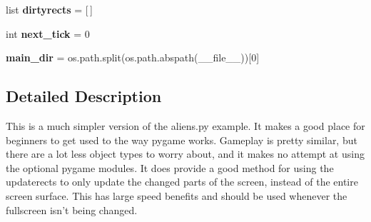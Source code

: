 \begin{DoxyCompactItemize}
list {\bfseries dirtyrects} = \mbox{[}$\,$\mbox{]}
\item 
\mbox{\label{namespacepygame_1_1examples_1_1oldalien_a0a712e753acbf5c4e3de1cf4933838c5}} 
int {\bfseries next\+\_\+tick} = 0
\item 
\mbox{\label{namespacepygame_1_1examples_1_1oldalien_a6ddc64ba8b4814f37fb935b0de86d53a}} 
{\bfseries main\+\_\+dir} = os.\+path.\+split(os.\+path.\+abspath(\+\_\+\+\_\+file\+\_\+\+\_\+))\mbox{[}0\mbox{]}
\end{DoxyCompactItemize}


\subsection{Detailed Description}
\begin{DoxyVerb}This is a much simpler version of the aliens.py
example. It makes a good place for beginners to get
used to the way pygame works. Gameplay is pretty similar,
but there are a lot less object types to worry about,
and it makes no attempt at using the optional pygame
modules.
It does provide a good method for using the updaterects
to only update the changed parts of the screen, instead of
the entire screen surface. This has large speed benefits
and should be used whenever the fullscreen isn't being changed.\end{DoxyVerb}
 